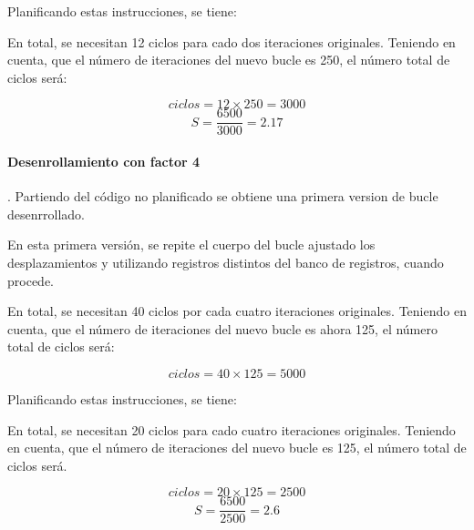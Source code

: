 Planificando estas instrucciones, se tiene:



En total, se necesitan 12 ciclos para cado dos iteraciones originales.
Teniendo en cuenta, que el número de iteraciones del nuevo bucle es 250,
el número total de ciclos será:

\[
ciclos = 12 \times 250 = 3000
\]
\[
S = \frac{6500}{3000} = 2.17
\]

\paragraph{Desenrollamiento con factor 4}.
Partiendo del código no planificado se obtiene una primera
version de bucle desenrrollado.



En esta primera versión, se repite el cuerpo del bucle ajustado los
desplazamientos y utilizando registros distintos del banco de registros,
cuando procede.

En total, se necesitan 40 ciclos por cada cuatro iteraciones originales.
Teniendo en cuenta, que el número de iteraciones del nuevo bucle es ahora 125,
el número total de ciclos será:

\[
ciclos = 40 \times 125 = 5000
\]

Planificando estas instrucciones, se tiene:



En total, se necesitan 20 ciclos para cado cuatro iteraciones originales.
Teniendo en cuenta, que el número de iteraciones del nuevo bucle es 125,
el número total de ciclos será.

\[
ciclos = 20 \times 125 = 2500
\]
\[
S = \frac{6500}{2500} = 2.6
\]
